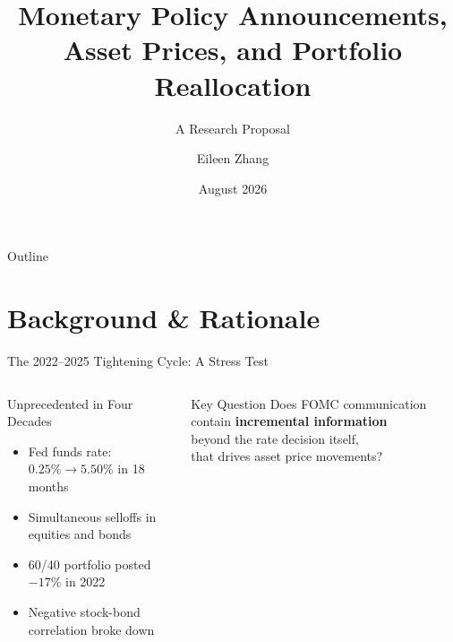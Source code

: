 \documentclass[aspectratio=169, 11pt]{beamer}
\title[Monetary Policy \& Asset Prices]{Monetary Policy Announcements, \\ Asset Prices, and Portfolio Reallocation}
\subtitle{A Research Proposal}
\author[E. Zhang]{Eileen Zhang}
\institute{Department of Finance}
\date{August 2026}
\begin{document}
\begin{frame}[plain]
  \titlepage
\end{frame}

\begin{frame}{Outline}
  \tableofcontents
\end{frame}

\section{Background \& Rationale}

\begin{frame}{The 2022--2025 Tightening Cycle: A Stress Test}
  \begin{columns}[T]
    \begin{ablock}{Unprecedented in Four Decades}
      \begin{itemize}
        \item Fed funds rate: $0.25\% \to 5.50\%$ in 18 months
        \item \alert{Simultaneous} selloffs in equities and bonds
        \item 60/40 portfolio posted $-17\%$ in 2022
        \item Negative stock-bond correlation \alert{broke down}
      \end{itemize}
    \end{ablock}

    \begin{aalertblock}{Key Question}
      Does FOMC communication contain \textbf{incremental information} \\
      beyond the rate decision itself, \\
      that drives asset price movements?
    \end{aalertblock}
  \end{columns}
\end{frame}
\end{document}

